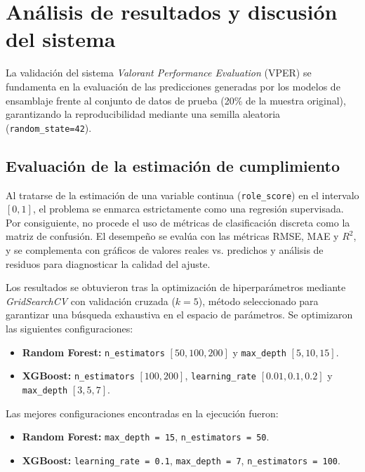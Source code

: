 \documentclass{ULBreport} %
\begin{document}
\section{Análisis de resultados y discusión del sistema}

La validación del sistema \textit{Valorant Performance Evaluation} (VPER) se fundamenta en la evaluación de las predicciones generadas por los modelos de ensamblaje frente al conjunto de datos de prueba (20\% de la muestra original), garantizando la reproducibilidad mediante una semilla aleatoria (\texttt{random\_state=42}). 

\subsection{Evaluación de la estimación de cumplimiento}

Al tratarse de la estimación de una variable continua (\texttt{role\_score}) en el intervalo $[0, 1]$, el problema se enmarca estrictamente como una regresión supervisada. Por consiguiente, no procede el uso de métricas de clasificación discreta como la matriz de confusión. El desempeño se evalúa con las métricas RMSE, MAE y $R^2$, y se complementa con gráficos de valores reales vs. predichos y análisis de residuos para diagnosticar la calidad del ajuste.

Los resultados se obtuvieron tras la optimización de hiperparámetros mediante \textit{GridSearchCV} con validación cruzada ($k = 5$), método seleccionado para garantizar una búsqueda exhaustiva en el espacio de parámetros. Se optimizaron las siguientes configuraciones:

\begin{itemize}
    \item \textbf{Random Forest:} \texttt{n\_estimators} $[50, 100, 200]$ y \texttt{max\_depth} $[5, 10, 15]$.
    \item \textbf{XGBoost:} \texttt{n\_estimators} $[100, 200]$, \texttt{learning\_rate} $[0.01, 0.1, 0.2]$ y \texttt{max\_depth} $[3, 5, 7]$.
\end{itemize}

Las mejores configuraciones encontradas en la ejecución fueron:

\begin{itemize}
    \item \textbf{Random Forest:} \texttt{max\_depth = 15}, \texttt{n\_estimators = 50}.
    \item \textbf{XGBoost:} \texttt{learning\_rate = 0.1}, \texttt{max\_depth = 7}, \texttt{n\_estimators = 100}.
\end{itemize}
\end{document}
